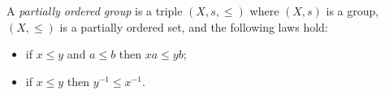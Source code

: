 A \textit{partially ordered group} is a triple $(X, s, \leqslant)$ where $(X, s)$ is a group, $(X, \leqslant)$ is a partially ordered set, and the following laws hold:
\begin{itemize}
\item if $x \leqslant y$ and $a \leqslant b$ then $xa \leqslant yb$;
\item if $x \leqslant y$ then $y^{-1} \leqslant x^{-1}$.
\end{itemize}
